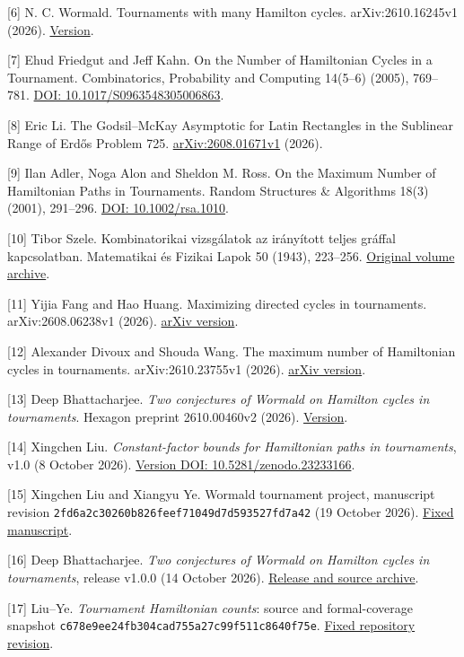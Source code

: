 \documentclass[11pt,a4paper]{article}
\begin{document}
{[}6{]} N. C. Wormald. Tournaments with many Hamilton cycles. arXiv:2610.16245v1 (2026). \href{https://arxiv.org/html/2610.16245v1}{Version}.

{[}7{]} Ehud Friedgut and Jeff Kahn. On the Number of Hamiltonian Cycles in a Tournament. Combinatorics, Probability and Computing 14(5--6) (2005), 769--781. \href{https://doi.org/10.1017/S0963548305006863}{DOI: 10.1017/S0963548305006863}.

{[}8{]} Eric Li. The Godsil--McKay Asymptotic for Latin Rectangles in the Sublinear Range of Erdős Problem 725. \href{https://arxiv.org/html/2608.01671v1}{arXiv:2608.01671v1} (2026).

{[}9{]} Ilan Adler, Noga Alon and Sheldon M. Ross. On the Maximum Number of Hamiltonian Paths in Tournaments. Random Structures \& Algorithms 18(3) (2001), 291--296. \href{https://doi.org/10.1002/rsa.1010}{DOI: 10.1002/rsa.1010}.

{[}10{]} Tibor Szele. Kombinatorikai vizsgálatok az irányított teljes gráffal kapcsolatban. Matematikai és Fizikai Lapok 50 (1943), 223--256. \href{https://real-j.mtak.hu/7300/}{Original volume archive}.

{[}11{]} Yijia Fang and Hao Huang. Maximizing directed cycles in tournaments. arXiv:2608.06238v1 (2026). \href{https://arxiv.org/html/2608.06238v1\#S3}{arXiv version}.

{[}12{]} Alexander Divoux and Shouda Wang. The maximum number of Hamiltonian cycles in tournaments. arXiv:2610.23755v1 (2026). \href{https://arxiv.org/html/2610.23755v1}{arXiv version}.

{[}13{]} Deep Bhattacharjee. \emph{Two conjectures of Wormald on Hamilton cycles in tournaments}. Hexagon preprint 2610.00460v2 (2026). \href{https://hexagonmath.org/2610.00460v2}{Version}.

{[}14{]} Xingchen Liu. \emph{Constant-factor bounds for Hamiltonian paths in tournaments}, v1.0 (8 October 2026). \href{https://doi.org/10.5281/zenodo.23233166}{Version DOI: 10.5281/zenodo.23233166}.

{[}15{]} Xingchen Liu and Xiangyu Ye. Wormald tournament project, manuscript revision \nolinkurl{2fd6a2c30260b826feef71049d7d593527fd7a42} (19 October 2026). \href{https://github.com/LStar404/wormald-tournament-conjectures/blob/2fd6a2c30260b826feef71049d7d593527fd7a42/docs/paper.zh.md}{Fixed manuscript}.

{[}16{]} Deep Bhattacharjee. \emph{Two conjectures of Wormald on Hamilton cycles in tournaments}, release v1.0.0 (14 October 2026). \href{https://github.com/creelie/Breakthrough-problems-1/releases/tag/v1.0.0}{Release and source archive}.

{[}17{]} Liu--Ye. \emph{Tournament Hamiltonian counts}: source and formal-coverage snapshot \nolinkurl{c678e9ee24fb304cad755a27c99f511c8640f75e}. \href{https://github.com/LStar404/tournament-hamiltonian-counts-20261028/tree/c678e9ee24fb304cad755a27c99f511c8640f75e}{Fixed repository revision}.
\end{document}
